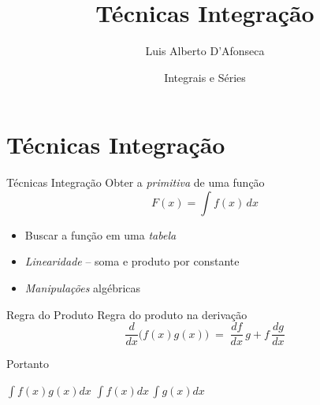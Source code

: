 
\usepackage{apresentacao}
\usepackage{mathconfig}
\usepackage{tabto}

\setlength{\parskip}{0.5\baselineskip}

\makeatletter
\graphicspath  {{./figs/}}
\makeatother

\title {Técnicas Integração}
\author{\large Luis Alberto D'Afonseca}
\date  {Integrais e Séries}



\begin{frame}
    \titlepage
\end{frame}

\section{Técnicas Integração}

\begin{frame}{Técnicas Integração}
  Obter a \emph{primitiva} de uma função
  \[
    F(x) = \int f(x)\,dx
  \]
  \pause
  \vspace{-\baselineskip}
  \begin{itemize}[<+->]
    \setlength\itemsep{1em}
    \item Buscar a função em uma \emph{tabela}
    \item \emph{Linearidade} -- soma e produto por constante
    \item \emph{Manipulações} algébricas
  \end{itemize}
\end{frame}

\begin{frame}{Regra do Produto}
  Regra do produto na derivação
  \[
    \frac{d}{dx}\big(f(x)g(x)\big) \;=\; \frac{df}{dx}\,g + f\, \frac{dg}{dx}
  \]

  \pause
  Portanto

  \vspace{5mm}
  \hspace{7mm}
  \(
    \int f(x)g(x)dx
  \)
  \;{\Large\color{red}$\neq$}\;
  \(
    \int f(x)dx\, \int g(x)dx
  \)
\end{frame}

